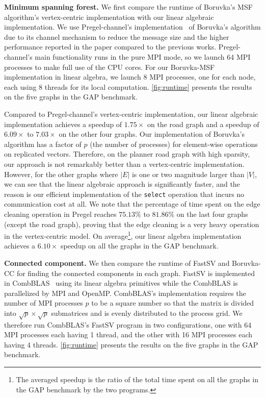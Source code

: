 \documentclass{sokendai_thesis} %
\newcommand{\boruvka}[0]{Boruvka}
\begin{document}
\textbf{Minimum spanning forest.}
We first compare the runtime of \boruvka{}'s MSF algorithm's vertex-centric implementation with our linear algebraic implementation.
We use Pregel-channel's implementation~\cite{zhang2019composing} of \boruvka{}'s algorithm due to its channel mechanism to reduce the message size and the higher performance reported in the paper compared to the previous works.
Pregel-channel's main functionality runs in the pure MPI mode, so we launch 64 MPI processes to make full use of the CPU cores.
For our \boruvka{}-MSF implementation in linear algebra, we launch 8 MPI processes, one for each node, each using 8 threads for its local computation.
\autoref{fig:runtime} presents the results on the five graphs in the GAP benchmark.

Compared to Pregel-channel's vertex-centric implementation, our linear algebraic implementation achieves a speedup of $1.75\times$ on the road graph and a speedup of $6.09\times$ to $7.03\times$ on the other four graphs.
Our implementation of \boruvka{}'s algorithm has a factor of $p$ (the number of processes) for element-wise operations on replicated vectors.
Therefore, on the planner road graph with high sparsity, our approach is not remarkably better than a vertex-centric implementation.
However, for the other graphs where $|E|$ is one or two magnitude larger than $|V|$, we can see that the linear algebraic approach is significantly faster, and the reason is our efficient implementation of the \texttt{select} operation that incurs no communication cost at all.
We note that the percentage of time spent on the edge cleaning operation in Pregel reaches $75.13\%$ to $81.86\%$ on the last four graphs (except the road graph), proving that the edge cleaning is a very heavy operation in the vertex-centric model.
On average\footnote{The averaged speedup is the ratio of the total time spent on all the graphs in the GAP benchmark by the two programs.}, our linear algebra implementation achieves a $6.10\times$ speedup on all the graphs in the GAP benchmark.

\textbf{Connected component.}
We then compare the runtime of FastSV and \boruvka{}-CC for finding the connected components in each graph.
FastSV is implemented in CombBLAS~\cite{combblas} using its linear algebra primitives while the CombBLAS is parallelized by MPI and OpenMP.
CombBLAS's implementation requires the number of MPI processes $p$ to be a square number so that the matrix is divided into $\sqrt{p}\times\sqrt{p}$ submatrices and is evenly distributed to the process grid.
We therefore run CombBLAS's FastSV program in two configurations, one with 64 MPI processes each having 1 thread, and the other with 16 MPI processes each having 4 threads.
\autoref{fig:runtime} presents the results on the five graphs in the GAP benchmark.
\end{document}

